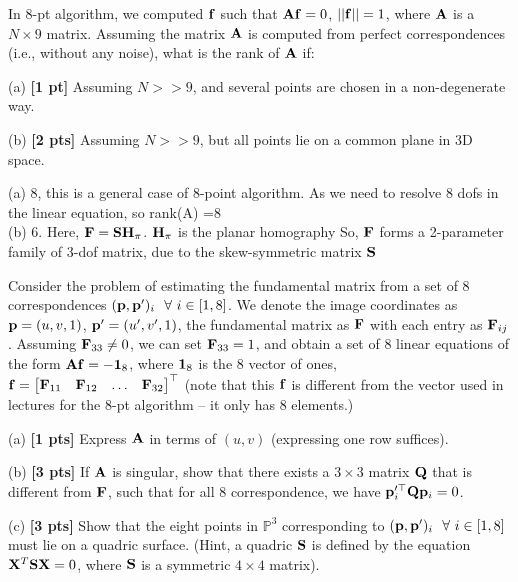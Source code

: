 \documentclass[11pt,addpoints,answers]{exam}
\numberwithin{equation}{section} %
\numberwithin{figure}{section} %
\numberwithin{table}{section} %
\begin{document}
\begin{questions}
\begin{tcolorbox}[fit,height=5cm, width=\textwidth, blank, borderline={0.5pt}{-2pt},halign=left, valign=center, nobeforeafter]
\end{tcolorbox}

\question In $8$-pt algorithm, we computed $\mathbf{f}$ such that $\mathbf{A}\mathbf{f} = 0$, $||\mathbf{f}|| = 1$, where $\mathbf{A}$ is a $N \times 9$ matrix. Assuming the matrix $\mathbf{A}$ is computed from perfect correspondences (i.e., without any noise), what is the rank of $\mathbf{A}$ if:

(a) \textbf{[1 pt]} Assuming $N >> 9$, and several points are chosen in a non-degenerate way.

(b) \textbf{[2 pts]} Assuming $N >> 9$, but all points lie on a common plane in 3D space.

\begin{tcolorbox}[fit,height=5cm, width=\textwidth, blank, borderline={0.5pt}{-2pt},halign=left, valign=center, nobeforeafter]

(a) 8, this is a general case of 8-point algorithm. As we need to resolve 8 dofs in the linear equation, so rank(A) =8\\
(b) 6. Here, $\mathbf{F} = \mathbf{S} \mathbf{H}_{\pi}$. $\mathbf{H}_{\pi}$ is the planar homography So, $\mathbf{F}$ forms a 2-parameter family of 3-dof matrix, due to the skew-symmetric matrix $\mathbf{S}$

\end{tcolorbox}

\question Consider the problem of estimating the fundamental matrix from a set of 8 correspondences $(\mathbf{p}, \mathbf{p}^\prime)_i~~\forall~ i \in [1, 8]$. We denote the image coordinates as $\mathbf{p} = (u, v, 1)$, $\mathbf{p}' = (u', v', 1)$, the fundamental matrix as $\mathbf{F}$ with each entry as $\mathbf{F}_{ij}$. Assuming $\mathbf{F}_{33} \neq 0$, we can set $\mathbf{F}_{33} = 1$, and obtain a set of 8 linear equations of the form $\mathbf{A} \mathbf{f} = -\boldsymbol{1}_8$, where $\boldsymbol{1}_8$ is the 8 vector of ones, $\mathbf{f} = \begin{bmatrix} \mathbf{F}_{11} & \mathbf{F}_{12} & \dots & \mathbf{F}_{32} \end{bmatrix}^\top$ (note  that this $\mathbf{f}$ is different from the vector used in lectures for the 8-pt algorithm -- it only has 8 elements.)

(a) \textbf{[1 pts]} Express $\mathbf{A}$ in terms of $(u, v)$ (expressing one row suffices).
        
(b) \textbf{[3 pts]} If $\mathbf{A}$ is singular, show that there exists a $3 \times 3$ matrix $\mathbf{Q}$ that is different from $\mathbf{F}$, such that for all $8$ correspondence, we have $\mathbf{p}_i^{\prime\top} \mathbf{Q} \mathbf{p}_i = 0$.

(c) \textbf{[3 pts]} Show that the eight points in $\mathbb{P}^3$ corresponding to $(\mathbf{p}, \mathbf{p}^\prime)_i~~\forall~ i \in [1, 8]$ must lie on a quadric surface. (Hint, a quadric $\mathbf{S}$ is defined by the equation $\mathbf{X}^T\mathbf{S}\mathbf{X} = 0$, where $\mathbf{S}$ is a symmetric $4 \times 4$ matrix).


\end{questions}
\end{document}
